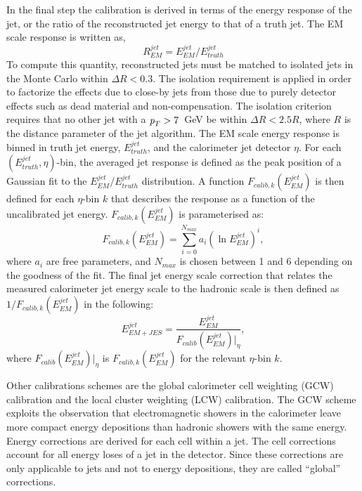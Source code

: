 In the final step the calibration is derived in terms of the energy response of the jet, or the ratio of the reconstructed jet energy to that of a truth jet.  The EM scale response is written as,
%
\begin{equation}
R^{jet}_{EM} = E^{jet}_{EM} / E^{jet}_{truth}
\end{equation}
%
To compute this quantity, reconstructed jets must be matched to isolated jets in the Monte Carlo within $\Delta R < 0.3$. The isolation requirement is applied in order to factorize the effects due to close-by jets from those due to purely detector effects such as dead material and non-compensation. The isolation criterion requires that no other jet with a ${\emph{p}_{T}} > 7$~GeV be within $\Delta R < 2.5R$, where $R$ is the distance parameter of the jet algorithm. The EM scale energy response is binned in truth jet energy, $E^{jet}_{truth}$, and the calorimeter jet detector $\eta$.  For each $(E^{jet}_{truth}, \eta)$-bin, the averaged jet response is defined as the peak position of a Gaussian fit to the $E^{jet}_{EM} / E^{jet}_{truth}$ distribution.  A function $F_{calib,k}(E^{jet}_{EM})$ is then defined for each $\eta$-bin $k$ that describes the response as a function of the uncalibrated jet energy. $F_{calib,k}(E^{jet}_{EM})$ is parameterised as:
%
\begin{equation}
F_{calib,k}(E^{jet}_{EM}) = \sum_{i=0}^{N_{max}} a_i (\ln E^{jet}_{EM})^i,
\end{equation}
%
where $a_i$ are free parameters, and $N_{max}$ is chosen between 1 and 6 depending on the goodness of the fit. The final jet energy scale correction that relates the measured calorimeter jet energy scale to the hadronic scale is then defined as $1/F_{calib,k}(E^{jet}_{EM})$ in the following:
%
\begin{equation}
E^{jet}_{EM+JES} = \frac{E^{jet}_{EM}}{F_{calib}(E^{jet}_{EM})|_{\eta}},
\end{equation}
%
where $F_{calib}(E^{jet}_{EM})|_{\eta}$  is $F_{calib,k}(E^{jet}_{EM})$ for the relevant $\eta$-bin $k$.


Other calibrations schemes are the global calorimeter cell weighting (GCW) calibration and the local cluster weighting (LCW) calibration.  The GCW scheme exploits the observation that electromagnetic showers in the calorimeter leave more compact energy depositions than hadronic showers with the same energy.  Energy corrections are derived for each cell within a jet.  The cell corrections account for all energy loses of a jet in the detector. Since these corrections are only applicable to jets and not to energy depositions, they are called ``global'' corrections.

